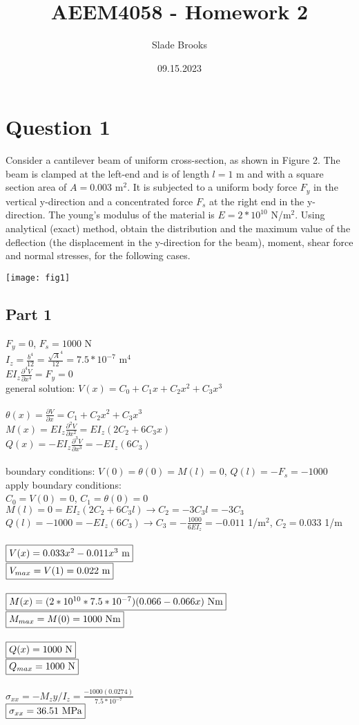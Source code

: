 \documentclass{article}
\title{AEEM4058 - Homework 2}
\author{Slade Brooks}
\date{09.15.2023}
\begin{document}
\maketitle

\section*{Question 1}
Consider a cantilever beam of uniform cross-section, as shown in Figure 2. The beam is
clamped at the left-end and is of length $l=1$ m and with a square section area of $A=0.003$ m$^2$.
It is subjected to a uniform body force $F_y$ in the vertical y-direction and a concentrated force
$F_s$ at the right end in the y-direction. The young’s modulus of the material is $E=2*10^{10}$
N/m$^2$. Using analytical (exact) method, obtain the distribution and the maximum value of
the deflection (the displacement in the y-direction for the beam), moment, shear force and
normal stresses, for the following cases.
\begin{center}
    \texttt{[image: fig1]}
\end{center}

\subsection*{Part 1}
$F_y=0$, $F_s=1000$ N \\
$I_z=\frac{b^4}{12}=\frac{\sqrt{A}^4}{12}=7.5*10^{-7}$ m$^4$ \\
$EI_z\frac{\partial^4V}{\partial x^4}=F_y=0$ \\
general solution: $V(x)=C_0+C_1x+C_2x^2+C_3x^3$ \\\\
$\theta(x)=\frac{\partial V}{\partial x}=C_1+C_2x^2+C_3x^3$ \\
$M(x)=EI_z\frac{\partial^2V}{\partial x^2}=EI_z(2C_2+6C_3x)$ \\
$Q(x)=-EI_z\frac{\partial^3V}{\partial x^3}=-EI_z(6C_3)$ \\\\
boundary conditions: $V(0)=\theta(0)=M(l)=0$, $Q(l)=-F_s=-1000$ \\
apply boundary conditions: \\
$C_0=V(0)=0$, $C_1=\theta(0)=0$ \\
$M(l)=0=EI_z(2C_2+6C_3l)\rightarrow C_2=-3C_3l=-3C_3$ \\
$Q(l)=-1000=-EI_z(6C_3)\rightarrow C_3=-\frac{1000}{6EI_z}=-0.011$ 1/m$^2$, $C_2=0.033$ 1/m \\\\
$\fbox{$V(x)=0.033x^2-0.011x^3$ m}$ \\
$\fbox{$V_{max}=V(1)=0.022$ m}$ \\\\
$\fbox{$M(x)=(2*10^{10}*7.5*10^{-7})(0.066-0.066x)$ Nm}$ \\
$\fbox{$M_{max}=M(0)=1000$ Nm}$ \\\\
$\fbox{$Q(x)=1000$ N}$ \\
$\fbox{$Q_{max}=1000$ N}$ \\\\
$\sigma_{xx}=-M_zy/I_z=\frac{-1000(0.0274)}{7.5*10^{-7}}$ \\
$\fbox{$\sigma_{xx}=36.51$ MPa}$
\end{document}
